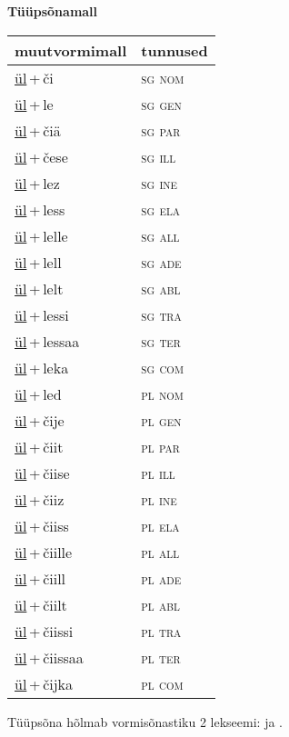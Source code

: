
\vspace{1.8em}
\begin{minipage}{\textwidth}
\textbf{Tüüpsõnamall \,}\\

\begin{sideways}
\begin{tabular}{l l}
muutvormimall & tunnused \\
\hline
\underline{ül}\,+\,či & \textsc{ sg nom } \\
\underline{ül}\,+\,le & \textsc{ sg gen } \\
\underline{ül}\,+\,čiä & \textsc{ sg par } \\
\underline{ül}\,+\,čese & \textsc{ sg ill } \\
\underline{ül}\,+\,lez & \textsc{ sg ine } \\
\underline{ül}\,+\,less & \textsc{ sg ela } \\
\underline{ül}\,+\,lelle & \textsc{ sg all } \\
\underline{ül}\,+\,lell & \textsc{ sg ade } \\
\underline{ül}\,+\,lelt & \textsc{ sg abl } \\
\underline{ül}\,+\,lessi & \textsc{ sg tra } \\
\underline{ül}\,+\,lessaa & \textsc{ sg ter } \\
\underline{ül}\,+\,leka & \textsc{ sg com } \\
\underline{ül}\,+\,led & \textsc{ pl nom } \\
\underline{ül}\,+\,čije & \textsc{ pl gen } \\
\underline{ül}\,+\,čiit & \textsc{ pl par } \\
\underline{ül}\,+\,čiise & \textsc{ pl ill } \\
\underline{ül}\,+\,čiiz & \textsc{ pl ine } \\
\underline{ül}\,+\,čiiss & \textsc{ pl ela } \\
\underline{ül}\,+\,čiille & \textsc{ pl all } \\
\underline{ül}\,+\,čiill & \textsc{ pl ade } \\
\underline{ül}\,+\,čiilt & \textsc{ pl abl } \\
\underline{ül}\,+\,čiissi & \textsc{ pl tra } \\
\underline{ül}\,+\,čiissaa & \textsc{ pl ter } \\
\underline{ül}\,+\,čijka & \textsc{ pl com } \\
\end{tabular}
\end{sideways}
\label{tab:tüüpsõnamall-ülči}

\end{minipage}

 
\vspace{1em}
\noindent Tüüpsõna hõlmab vormisõnastiku 2 lekseemi:  ja .
